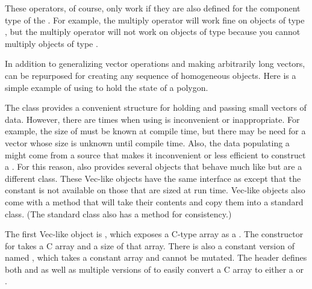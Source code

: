 
These operators, of course, only work if they are also defined for the
component type of the . For example, the multiply operator will
work fine on objects of type , but the multiply
operator will not work on objects of type 
because you cannot multiply objects of type .

In addition to generalizing vector operations and making arbitrarily long
vectors,  can be repurposed for creating any sequence of
homogeneous objects. Here is a simple example of using  to hold
the state of a polygon.



The  class provides a convenient structure for holding and passing small vectors of data.
However, there are times when using  is inconvenient or inappropriate.
For example, the size of  must be known at compile time, but there may be need for a vector whose size is unknown until compile time.
Also, the data populating a  might come from a source that makes it inconvenient or less efficient to construct a .
For this reason, \VTKm also provides several  objects that behave much like  but are a different class.
These Vec-like objects have the same interface as  except that the  constant is not available on those that are sized at run time.
Vec-like objects also come with a  method that will take their contents and copy them into a standard  class.
(The standard  class also has a  method for consistency.)

The first Vec-like object is , which exposes a C-type array as a .
The constructor for  takes a C array and a size of that array.
There is also a constant version of  named , which takes a constant array and cannot be mutated.
The  header defines both  and  as well as multiple versions of  to easily convert a C array to either a  or .

